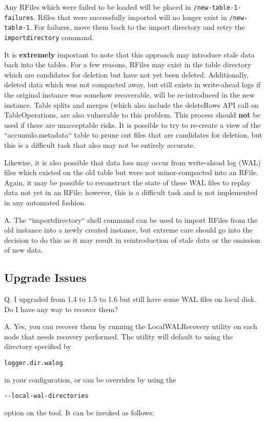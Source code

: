 Any RFiles which were failed to be loaded will be placed in \texttt{/new-table-1-failures}. Rfiles that were successfully
imported will no longer exist in \texttt{/new-table-1}. For failures, move them back to the import directory and retry
the \texttt{importdirectory} command.

It is \textbf{extremely} important to note that this approach may introduce stale data back into
the tables. For a few reasons, RFiles may exist in the table directory which are candidates for deletion but have
not yet been deleted. Additionally, deleted data which was not compacted away, but still exists in write-ahead logs if
the original instance was somehow recoverable, will be re-introduced in the new instance. Table splits and merges
(which also include the deleteRows API call on TableOperations, are also vulnerable to this problem. This process should
\textbf{not} be used if these are unacceptable risks. It is possible to try to re-create a view of the ``accumulo.metadata``
table to prune out files that are candidates for deletion, but this is a difficult task that also may not be entirely accurate.

Likewise, it is also possible that data loss may occur from write-ahead log (WAL) files which existed on the old table but
were not minor-compacted into an RFile. Again, it may be possible to reconstruct the state of these WAL files to
replay data not yet in an RFile; however, this is a difficult task and is not implemented in any automated fashion.

A. The ``importdirectory`` shell command can be used to import RFiles from the old instance into a newly created instance,
but extreme care should go into the decision to do this as it may result in reintroduction of stale data or the
omission of new data.

\subsection{Upgrade Issues}
Q. I upgraded from 1.4 to 1.5 to 1.6 but still have some WAL files on local disk. Do I have any way to recover them?

A. Yes, you can recover them by running the LocalWALRecovery utility on each node that needs recovery performed. The utility
will default to using the directory specified by \begin{verbatim}logger.dir.walog\end{verbatim} in your configuration, or can be
overriden by using the \begin{verbatim}--local-wal-directories\end{verbatim} option on the tool. It can be invoked as follows:

